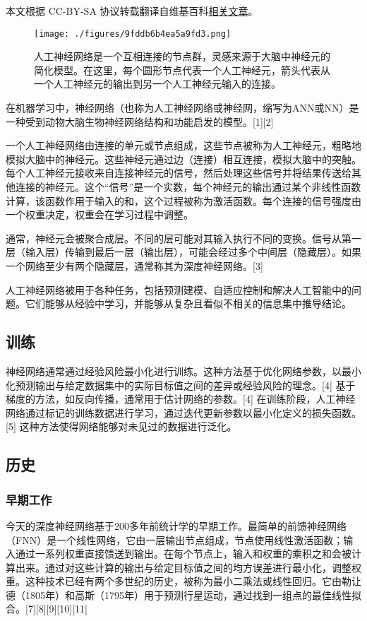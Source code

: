 
本文根据 CC-BY-SA 协议转载翻译自维基百科\href{https://en.wikipedia.org/wiki/Neural_network_(machine_learning)}{相关文章}。

\begin{figure}[ht]
\centering
\texttt{[image: ./figures/9fddb6b4ea5a9fd3.png]}
\caption{人工神经网络是一个互相连接的节点群，灵感来源于大脑中神经元的简化模型。在这里，每个圆形节点代表一个人工神经元，箭头代表从一个人工神经元的输出到另一个人工神经元输入的连接。} \label{fig_RGSJ_1}
\end{figure}
在机器学习中，神经网络（也称为人工神经网络或神经网，缩写为ANN或NN）是一种受到动物大脑生物神经网络结构和功能启发的模型。[1][2]

一个人工神经网络由连接的单元或节点组成，这些节点被称为人工神经元，粗略地模拟大脑中的神经元。这些神经元通过边（连接）相互连接，模拟大脑中的突触。每个人工神经元接收来自连接神经元的信号，然后处理这些信号并将结果传送给其他连接的神经元。这个“信号”是一个实数，每个神经元的输出通过某个非线性函数计算，该函数作用于输入的和，这个过程被称为激活函数。每个连接的信号强度由一个权重决定，权重会在学习过程中调整。

通常，神经元会被聚合成层。不同的层可能对其输入执行不同的变换。信号从第一层（输入层）传输到最后一层（输出层），可能会经过多个中间层（隐藏层）。如果一个网络至少有两个隐藏层，通常称其为深度神经网络。[3]

人工神经网络被用于各种任务，包括预测建模、自适应控制和解决人工智能中的问题。它们能够从经验中学习，并能够从复杂且看似不相关的信息集中推导结论。
\subsection{训练}
神经网络通常通过经验风险最小化进行训练。这种方法基于优化网络参数，以最小化预测输出与给定数据集中的实际目标值之间的差异或经验风险的理念。[4] 基于梯度的方法，如反向传播，通常用于估计网络的参数。[4] 在训练阶段，人工神经网络通过标记的训练数据进行学习，通过迭代更新参数以最小化定义的损失函数。[5] 这种方法使得网络能够对未见过的数据进行泛化。
\subsection{历史}  
\subsubsection{早期工作}  
今天的深度神经网络基于200多年前统计学的早期工作。最简单的前馈神经网络（FNN）是一个线性网络，它由一层输出节点组成，节点使用线性激活函数；输入通过一系列权重直接馈送到输出。在每个节点上，输入和权重的乘积之和会被计算出来。通过对这些计算的输出与给定目标值之间的均方误差进行最小化，调整权重。这种技术已经有两个多世纪的历史，被称为最小二乘法或线性回归。它由勒让德（1805年）和高斯（1795年）用于预测行星运动，通过找到一组点的最佳线性拟合。[7][8][9][10][11]  

